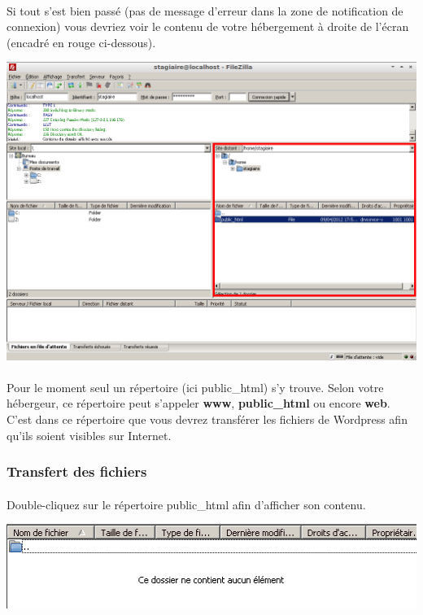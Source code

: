 \documentclass[10pt,a4paper]{article}
\begin{document}
\paragraph{}Si tout s'est bien passé (pas de message d'erreur dans la zone de notification de connexion) vous devriez voir le contenu de votre hébergement à droite de l'écran (encadré en rouge ci-dessous).
\begin{center}
\includegraphics[scale=0.35]{img/0033.png}
\end{center}
\paragraph{}Pour le moment seul un répertoire (ici public\_html) s'y trouve. Selon votre hébergeur, ce répertoire peut s'appeler \textbf{www}, \textbf{public\_html} ou encore \textbf{web}. C'est dans ce répertoire que  vous devrez transférer les fichiers de Wordpress afin qu'ils soient visibles sur Internet.
\subsubsection{Transfert des fichiers}
\paragraph{}Double-cliquez sur le répertoire public\_html afin d'afficher son contenu.
\begin{center}
\includegraphics[scale=0.5]{img/0034.png}
\end{center}
\end{document}
